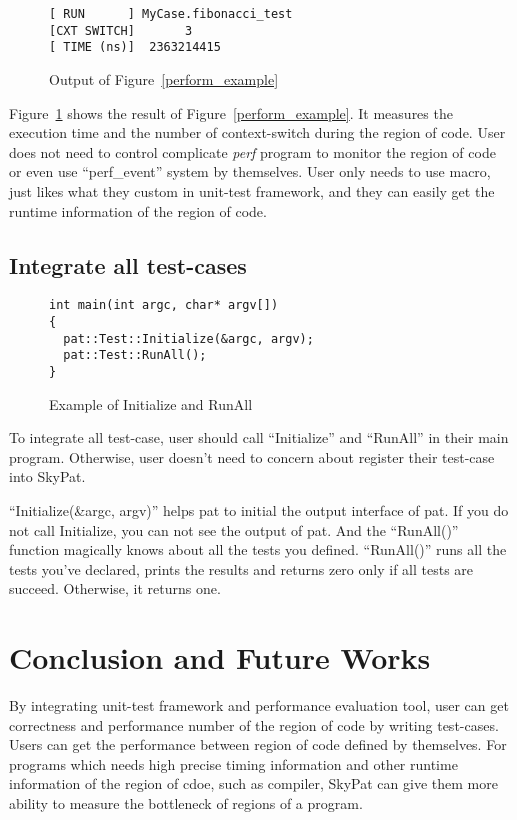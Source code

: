 \documentclass[final]{ols}
\begin{document}
\begin{figure}[h]
\lstset{language=sh}
\begin{lstlisting}[frame=single]
[ RUN      ] MyCase.fibonacci_test
[CXT SWITCH]       3
[ TIME (ns)]  2363214415
\end{lstlisting}
\caption{Output of Figure~\ref{perform_example}}
\label{perform_example_output}
\end{figure}

Figure~\ref{perform_example_output} shows the result of Figure~\ref{perform_example}.
It measures the execution time and the number of context-switch during the region of code.
User does not need to control complicate \textit{perf} program to monitor the region of code or even use ``perf\_event'' system by themselves.
User only needs to use macro, just likes what they custom in unit-test framework, and they can easily get the runtime information of the region of code.

\subsection{Integrate all test-cases}

\begin{figure}[h]
\lstset{language=C++}
\begin{lstlisting}[frame=single]
int main(int argc, char* argv[])
{
  pat::Test::Initialize(&argc, argv);
  pat::Test::RunAll();
}
\end{lstlisting}
\caption{Example of Initialize and RunAll}
\label{main_example}
\end{figure}

To integrate all test-case, user should call ``Initialize'' and ``RunAll'' in their main program.
Otherwise, user doesn't need to concern about register their test-case into SkyPat.

``Initialize(\&argc, argv)'' helps pat to initial the output interface of pat. If you do not call Initialize, you can not see the output of pat.
And the ``RunAll()'' function magically knows about all the tests you defined.
``RunAll()'' runs all the tests you've declared, prints the results and returns zero only if all tests are succeed. Otherwise, it returns one.

\section{Conclusion and Future Works}
By integrating unit-test framework and performance evaluation tool, user can get correctness and performance number of the region of code by writing test-cases.
Users can get the performance between region of code defined by themselves.
For programs which needs high precise timing information and other runtime information of the region of cdoe, such as compiler, SkyPat can give them more ability to measure the bottleneck of regions of a program.
\end{document}
